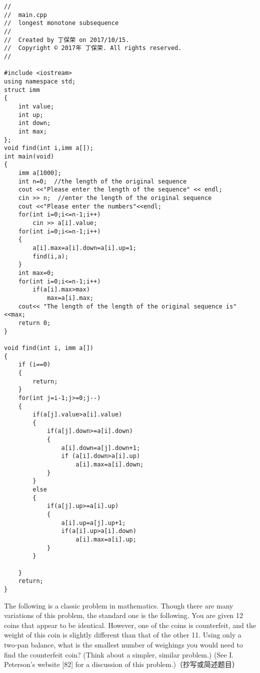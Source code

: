 \documentclass[11pt, a4paper, UTF8]{ctexart}
\begin{document}
\begin{solution}
\begin{lstlisting}
//
//  main.cpp
//  longest monotone subsequence
//
//  Created by 丁保荣 on 2017/10/15.
//  Copyright © 2017年 丁保荣. All rights reserved.
//

#include <iostream>
using namespace std;
struct imm
{
    int value;
    int up;
    int down;
    int max;
};
void find(int i,imm a[]);
int main(void)
{
    imm a[1000];
    int n=0;  //the length of the original sequence
    cout <<"Please enter the length of the sequence" << endl;
    cin >> n;  //enter the length of the original sequence
    cout <<"Please enter the numbers"<<endl;
    for(int i=0;i<=n-1;i++)
        cin >> a[i].value;
    for(int i=0;i<=n-1;i++)
    {
        a[i].max=a[i].down=a[i].up=1;
        find(i,a);
    }
    int max=0;
    for(int i=0;i<=n-1;i++)
        if(a[i].max>max)
            max=a[i].max;
    cout<< "The length of the length of the original sequence is" <<max;
    return 0;
}

void find(int i, imm a[])
{
    if (i==0)
    {
        return;
    }
    for(int j=i-1;j>=0;j--)
    {
        if(a[j].value>a[i].value)
        {
            if(a[j].down>=a[i].down)
            {
                a[i].down=a[j].down+1;
                if (a[i].down>a[i].up)
                    a[i].max=a[i].down;
            }
        }
        else
        {
            if(a[j].up>=a[i].up)
            {
                a[i].up=a[j].up+1;
                if(a[i].up>a[i].down)
                    a[i].max=a[i].up;
            }
        }
        
    }
    return;
}

\end{lstlisting}

\end{solution}





\begincorrection	%

\begin{problem}[UD:1.8]
The following is a classic problem in mathematics. Though there are many variations of this problem, the standard one is the following.
You are given 12 coins that appear to be identical. However, one of the coins is counterfeit, and the weight of this coin is slightly different than that of the other 11. Using only a two-pan balance, what is the smallest number of weighings you would need to find the counterfeit coin? (Think about a simpler, similar problem.)
(See I. Peterson’s website [82] for a discussion of this problem.)（抄写或简述题目）
\end{problem}
\end{document}
